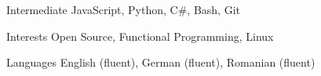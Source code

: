 
\begin{cvskills}


    \cvskill
    {Intermediate}
    {JavaScript, Python, C\#, Bash, Git}

   \cvskill
    {Interests}
    {Open Source, Functional Programming, Linux}

  \cvskill
    {Languages}
    {English (fluent), German (fluent), Romanian (fluent)}

\end{cvskills}